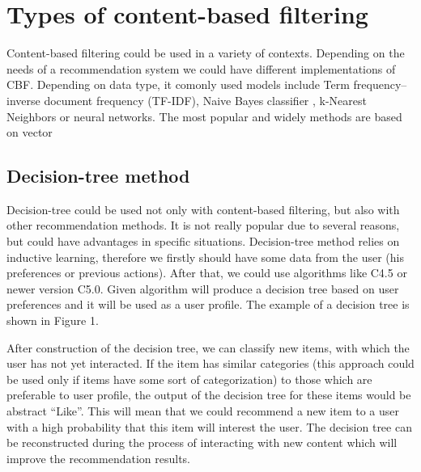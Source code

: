 \section{Types of content-based filtering}\label{sec:cbf_types}
Content-based filtering could be used in a variety of contexts. Depending on the needs of a recommendation system we could have different implementations of CBF. Depending on data type, it comonly used models include Term frequency–inverse document frequency (TF-IDF)\cite{TF_IDF}, Naive Bayes classifier \cite{Naive_classifier}, k-Nearest Neighbors or neural networks. The most popular and widely methods are based on vector 

\subsection{Decision-tree method}
Decision-tree could be used not only with content-based filtering, but also with other recommendation methods. It is not really popular due to several reasons, but could have advantages in specific situations. Decision-tree method relies on inductive learning, therefore we firstly should have some data from the user (his preferences or previous actions). After that, we could use algorithms like C4.5\cite{C4_5} or newer version C5.0. Given algorithm will produce a decision tree based on user preferences and it will be used as a user profile. The example of a decision tree is shown in Figure 1\cite{Decision_Tree}.

After construction of the decision tree, we can classify new items, with which the user has not yet interacted. If the item has similar categories (this approach could be used only if items have some sort of categorization) to those which are preferable to user profile, the output of the decision tree for these items would be abstract “Like”. This will mean that we could recommend a new item to a user with a high probability that this item will interest the user. The decision tree can be reconstructed during the process of interacting with new content which will improve the recommendation results.

